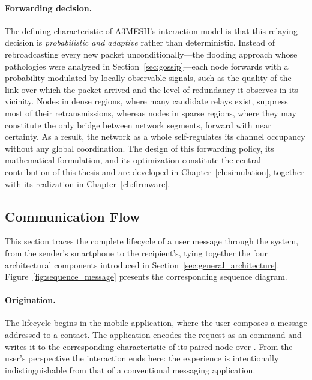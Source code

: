 \documentclass[english,bachelor]{tfgitic}[2026/01/22]
\begin{document}
\paragraph{Forwarding decision.} The defining characteristic of A3MESH's interaction model is that this relaying decision is \emph{probabilistic and adaptive} rather than deterministic. Instead of rebroadcasting every new packet unconditionally---the flooding approach whose pathologies were analyzed in Section~\ref{sec:gossip}---each node forwards with a probability modulated by locally observable signals, such as the quality of the link over which the packet arrived and the level of redundancy it observes in its vicinity. Nodes in dense regions, where many candidate relays exist, suppress most of their retransmissions, whereas nodes in sparse regions, where they may constitute the only bridge between network segments, forward with near certainty. As a result, the network as a whole self-regulates its channel occupancy without any global coordination. The design of this forwarding policy, its mathematical formulation, and its optimization constitute the central contribution of this thesis and are developed in Chapter~\ref{ch:simulation}, together with its realization in Chapter~\ref{ch:firmware}.


\subsection{Communication Flow}
\label{sec:communication_flow}

This section traces the complete lifecycle of a user message through the system, from the sender's smartphone to the recipient's, tying together the four architectural components introduced in Section~\ref{sec:general_architecture}. Figure~\ref{fig:sequence_message} presents the corresponding sequence diagram.


\paragraph{Origination.} The lifecycle begins in the mobile application, where the user composes a message addressed to a contact. The application encodes the request as an  command and writes it to the corresponding  characteristic of its paired node over . From the user's perspective the interaction ends here: the experience is intentionally indistinguishable from that of a conventional messaging application.
\end{document}
